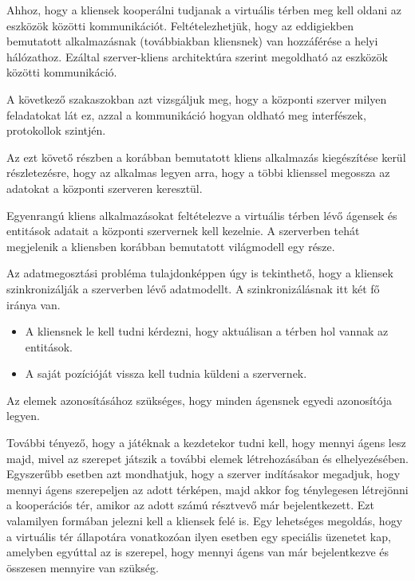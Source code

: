 
Ahhoz, hogy a kliensek kooperálni tudjanak a virtuális térben meg kell oldani az eszközök közötti kommunikációt.
Feltételezhetjük, hogy az eddigiekben bemutatott alkalmazásnak (továbbiakban kliensnek) van hozzáférése a helyi hálózathoz.
Ezáltal szerver-kliens architektúra szerint megoldható az eszközök közötti kommunikáció.

A következő szakaszokban azt vizsgáljuk meg, hogy a központi szerver milyen feladatokat lát ez, azzal a kommunikáció hogyan oldható meg interfészek, protokollok szintjén.

Az ezt követő részben a korábban bemutatott kliens alkalmazás kiegészítése kerül részletezésre, hogy az alkalmas legyen arra, hogy a többi klienssel megossza az adatokat a központi szerveren keresztül.


Egyenrangú kliens alkalmazásokat feltételezve a virtuális térben lévő ágensek és entitások adatait a központi szervernek kell kezelnie.
A szerverben tehát megjelenik a kliensben korábban bemutatott világmodell egy része.

Az adatmegosztási probléma tulajdonképpen úgy is tekinthető, hogy a kliensek szinkronizálják a szerverben lévő adatmodellt.
A szinkronizálásnak itt két fő iránya van.
\begin{itemize}
	\item A kliensnek le kell tudni kérdezni, hogy aktuálisan a térben hol vannak az entitások.
	\item A saját pozícióját vissza kell tudnia küldeni a szervernek.
\end{itemize}
Az elemek azonosításához szükséges, hogy minden ágensnek egyedi azonosítója legyen.

További tényező, hogy a játéknak a kezdetekor tudni kell, hogy mennyi ágens lesz majd, mivel az szerepet játszik a további elemek létrehozásában és elhelyezésében.
Egyszerűbb esetben azt mondhatjuk, hogy a szerver indításakor megadjuk, hogy mennyi ágens szerepeljen az adott térképen, majd akkor fog ténylegesen létrejönni a kooperációs tér, amikor az adott számú résztvevő már bejelentkezett.
Ezt valamilyen formában jelezni kell a kliensek felé is.
Egy lehetséges megoldás, hogy a virtuális tér állapotára vonatkozóan ilyen esetben egy speciális üzenetet kap, amelyben egyúttal az is szerepel, hogy mennyi ágens van már bejelentkezve és összesen mennyire van szükség.

